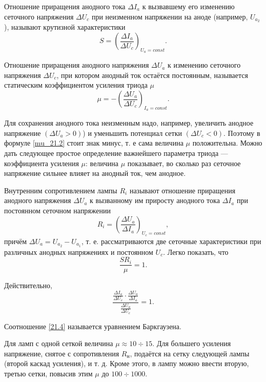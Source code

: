 \documentclass[a4paper,10pt]{book}
\begin{document}
Отношение приращения анодного тока $\Delta I_a$ к вызвавшему его изменению сеточного напряжения $\Delta U_c$ при неизменном напряжении на аноде (например, $U_{a_2}$), называют крутизной характеристики
\begin{equation}
S = (\frac{\Delta I_a}{\Delta U_c})_{U_a=const}.
\end{equation}

Отношение приращения анодного напряжения $\Delta U_a$ к изменению сеточного напряжения $\Delta U_c$, при котором анодный ток остаётся постоянным, называется статическим коэффициентом усиления триода $\mu$ \begin{equation}\label{mu_21.2}
\mu = - (\frac{\Delta U_a}{\Delta U_c})_{I_a=const}.
\end{equation}

Для сохранения анодного тока неизменным надо, например, увеличить анодное напряжение $(\Delta U_a > 0)$) и уменьшить потенциал сетки $(\Delta U_c < 0)$. Поэтому в формуле \ref{mu_21.2} стоит знак минус, т. е сама величина $\mu$ положительна. Можно дать следующее простое определение важнейшего параметра триода — коэффициента усиления $\mu$: величина $\mu$ показывает, во сколько раз сеточное напряжение сильнее влияет на анодный ток, чем анодное.

Внутренним сопротивлением лампы $R_i$ называют отношение приращения анодного напряжения $\Delta U_a$ к вызванному им приросту анодного тока $\Delta I_a$ при постоянном сеточном напряжении\begin{equation}\label{21.3}
R_i = (\frac{\Delta U_a}{\Delta I_a})_{U_c=const},
\end{equation}
причём $\Delta U_a = U_{a_2}-U_{a_1}$, т. е. рассматриваются две сеточные характеристики при различных анодных напряжениях и постоянном $U_c$. Легко показать, что\begin{equation}\label{21.4}
\frac{S R_i}{\mu} = 1.
\end{equation}

Действительно, \begin{equation}
\frac{\frac{\Delta I_a}{\Delta U_c}\cdot\frac{\Delta U_a}{\Delta I_a}}{\frac{\Delta U_a}{\Delta U_c}} = 1.\nonumber
\end{equation}

Соотношение \ref{21.4} называется уравнением Баркгаузена.

Для ламп с одной сеткой величина $\mu \approx 10 \div 15$. Для большего усиления напряжение, снятое с сопротивления $R_\text{н}$, подаётся на сетку следующей лампы (второй каскад усиления), и т. д. Кроме этого, в лампу можно ввести вторую, третью сетки, повысив этим $\mu$ до $100 \div 1000$.
\end{document}

